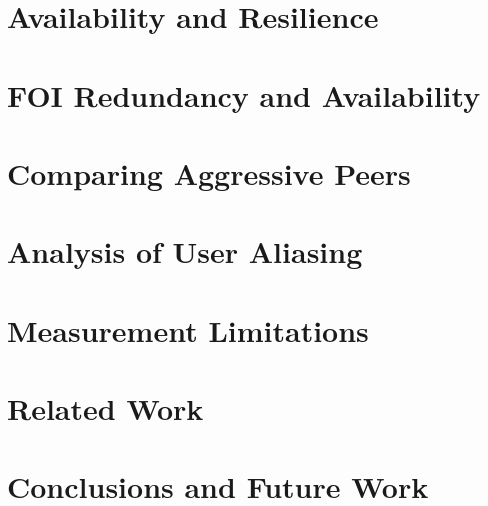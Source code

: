 \documentclass[notes]{beamer}
\begin{document}
\section{Availability and Resilience}
\begin{frame}

\end{frame}

\section{FOI Redundancy and Availability}
\begin{frame}

\end{frame}

\section{Comparing Aggressive Peers}
\begin{frame}

\end{frame}

\section{Analysis of User Aliasing}
\begin{frame}

\end{frame}

\section{Measurement Limitations}
\begin{frame}

\end{frame}

\section{Related Work}
\begin{frame}

\end{frame}

\section{Conclusions and Future Work}
\begin{frame}

\end{frame}
\end{document}
